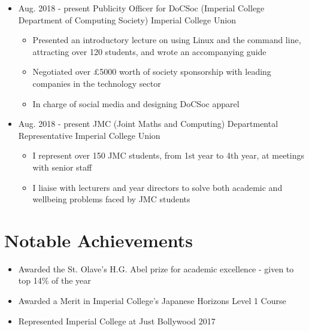 \documentclass[11pt,a4paper,sans]{moderncv}        %
\begin{document}
\begin{itemize}

\item{
\cventry
{Aug. 2018 - present}
{Publicity Officer for DoCSoc (Imperial College Department of Computing Society)}
{Imperial College Union}
{}{}{
\begin{itemize}
\item Presented an introductory lecture on using Linux and the command line, attracting over 120 students, and wrote an accompanying guide
\item Negotiated over £5000 worth of society sponsorship with leading companies in the technology sector
\item In charge of social media and designing DoCSoc apparel
\end{itemize}
}}

\item{
\cventry
{Aug. 2018 - present}
{JMC (Joint Maths and Computing) Departmental Representative}
{Imperial College Union}
{}{}{
\begin{itemize}
\item I represent over 150 JMC students, from 1st year to 4th year, at meetings with senior staff
\item I liaise with lecturers and year directors to solve both academic and wellbeing problems faced by JMC students
\end{itemize}
}}

\end{itemize}

\section{Notable Achievements}

\begin{itemize}

\item Awarded the St. Olave's H.G. Abel prize for academic excellence - given to top 14\% of the year

\item Awarded a Merit in Imperial College's Japanese Horizons Level 1 Course

\item Represented Imperial College at Just Bollywood 2017

\end{itemize}

\nocite{*}

\end{document}
